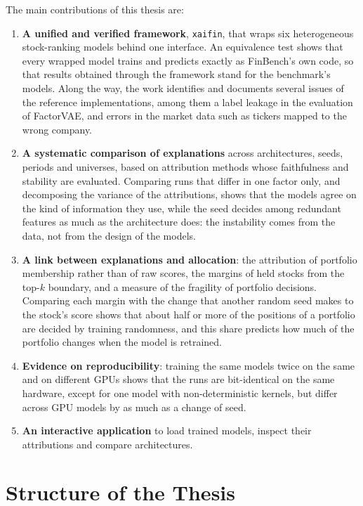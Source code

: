 The main contributions of this thesis are:
\begin{enumerate}[noitemsep]
    \item \textbf{A unified and verified framework}, \texttt{xaifin}, that wraps six heterogeneous stock-ranking models behind one interface. An equivalence test shows that every wrapped model trains and predicts exactly as FinBench's own code, so that results obtained through the framework stand for the benchmark's models. Along the way, the work identifies and documents several issues of the reference implementations, among them a label leakage in the evaluation of FactorVAE, and errors in the market data such as tickers mapped to the wrong company.
    \item \textbf{A systematic comparison of explanations} across architectures, seeds, periods and universes, based on attribution methods whose faithfulness and stability are evaluated. Comparing runs that differ in one factor only, and decomposing the variance of the attributions, shows that the models agree on the kind of information they use, while the seed decides among redundant features as much as the architecture does: the instability comes from the data, not from the design of the models.
    \item \textbf{A link between explanations and allocation}: the attribution of portfolio membership rather than of raw scores, the margins of held stocks from the top-$k$ boundary, and a measure of the fragility of portfolio decisions. Comparing each margin with the change that another random seed makes to the stock's score shows that about half or more of the positions of a portfolio are decided by training randomness, and this share predicts how much of the portfolio changes when the model is retrained.
    \item \textbf{Evidence on reproducibility}: training the same models twice on the same and on different GPUs shows that the runs are bit-identical on the same hardware, except for one model with non-deterministic kernels, but differ across GPU models by as much as a change of seed.
    \item \textbf{An interactive application} to load trained models, inspect their attributions and compare architectures.
\end{enumerate}


\section{Structure of the Thesis}
\label{sec:intro_structure}

